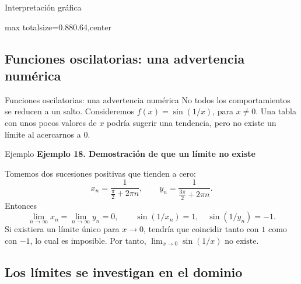 \documentclass[12pt,aspectratio=169]{beamer}
\begin{document}
\begin{frame}[t,allowframebreaks]{Interpretación gráfica}
\begin{center}
\begin{adjustbox}{max totalsize={0.88\linewidth}{0.64\textheight},center}\end{adjustbox}
\end{center}
\end{frame}


\subsection{Funciones oscilatorias: una advertencia numérica}

\begin{frame}[t,allowframebreaks]{Funciones oscilatorias: una advertencia numérica}
No todos los comportamientos se reducen a un salto. Consideremos $f(x)=\sin(1/x)$, para $x\ne0$. Una tabla con unos pocos valores de $x$ podría sugerir una tendencia, pero no existe un límite al acercarnos a $0$.
\end{frame}


\begin{frame}[t,allowframebreaks]{Ejemplo}
{\color{azul}\bfseries Ejemplo 18. Demostración de que un límite no existe}\par\medskip

Tomemos dos sucesiones positivas que tienden a cero:
\[
 x_n=\frac{1}{\frac\pi2+2\pi n},\qquad
 y_n=\frac{1}{\frac{3\pi}2+2\pi n}.
\]
Entonces
\[
 \lim_{n\to\infty}x_n=\lim_{n\to\infty}y_n=0,
 \qquad \sin(1/x_n)=1,\quad \sin(1/y_n)=-1.
\]
Si existiera un límite único para $x\to0$, tendría que coincidir tanto con $1$ como con $-1$, lo cual es imposible. Por tanto, $\boxed{\lim_{x\to0}\sin(1/x)\text{ no existe}.}$
\end{frame}


\subsection{Los límites se investigan en el dominio}
\end{document}
